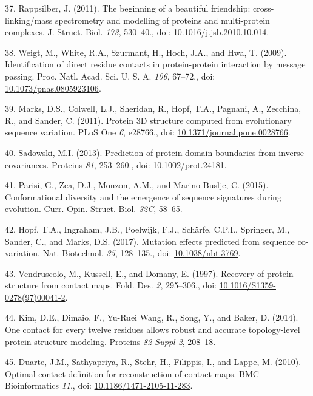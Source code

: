 \documentclass[11pt,a4paper,twoside]{book}
\theoremstyle{definition}
\theoremstyle{definition}
\theoremstyle{remark}
\begin{document}
\hypertarget{ref-Rappsilber2011}{}
37. Rappsilber, J. (2011). The beginning of a beautiful friendship:
cross-linking/mass spectrometry and modelling of proteins and
multi-protein complexes. J. Struct. Biol. \emph{173}, 530--40., doi:
\href{https://doi.org/10.1016/j.jsb.2010.10.014}{10.1016/j.jsb.2010.10.014}.

\hypertarget{ref-Weigt2009}{}
38. Weigt, M., White, R.A., Szurmant, H., Hoch, J.A., and Hwa, T.
(2009). Identification of direct residue contacts in protein-protein
interaction by message passing. Proc. Natl. Acad. Sci. U. S. A.
\emph{106}, 67--72., doi:
\href{https://doi.org/10.1073/pnas.0805923106}{10.1073/pnas.0805923106}.

\hypertarget{ref-Marks2011}{}
39. Marks, D.S., Colwell, L.J., Sheridan, R., Hopf, T.A., Pagnani, A.,
Zecchina, R., and Sander, C. (2011). Protein 3D structure computed from
evolutionary sequence variation. PLoS One \emph{6}, e28766., doi:
\href{https://doi.org/10.1371/journal.pone.0028766}{10.1371/journal.pone.0028766}.

\hypertarget{ref-Sadowski2013}{}
40. Sadowski, M.I. (2013). Prediction of protein domain boundaries from
inverse covariances. Proteins \emph{81}, 253--260., doi:
\href{https://doi.org/10.1002/prot.24181}{10.1002/prot.24181}.

\hypertarget{ref-Parisi2015a}{}
41. Parisi, G., Zea, D.J., Monzon, A.M., and Marino-Buslje, C. (2015).
Conformational diversity and the emergence of sequence signatures during
evolution. Curr. Opin. Struct. Biol. \emph{32C}, 58--65.

\hypertarget{ref-Hopf2017}{}
42. Hopf, T.A., Ingraham, J.B., Poelwijk, F.J., Schärfe, C.P.I.,
Springer, M., Sander, C., and Marks, D.S. (2017). Mutation effects
predicted from sequence co-variation. Nat. Biotechnol. \emph{35},
128--135., doi:
\href{https://doi.org/10.1038/nbt.3769}{10.1038/nbt.3769}.

\hypertarget{ref-Vendruscolo1997}{}
43. Vendruscolo, M., Kussell, E., and Domany, E. (1997). Recovery of
protein structure from contact maps. Fold. Des. \emph{2}, 295--306.,
doi:
\href{https://doi.org/10.1016/S1359-0278(97)00041-2}{10.1016/S1359-0278(97)00041-2}.

\hypertarget{ref-Kim2014}{}
44. Kim, D.E., Dimaio, F., Yu-Ruei Wang, R., Song, Y., and Baker, D.
(2014). One contact for every twelve residues allows robust and accurate
topology-level protein structure modeling. Proteins \emph{82 Suppl 2},
208--18.

\hypertarget{ref-Duarte2010}{}
45. Duarte, J.M., Sathyapriya, R., Stehr, H., Filippis, I., and Lappe,
M. (2010). Optimal contact definition for reconstruction of contact
maps. BMC Bioinformatics \emph{11}., doi:
\href{https://doi.org/10.1186/1471-2105-11-283}{10.1186/1471-2105-11-283}.
\end{document}
